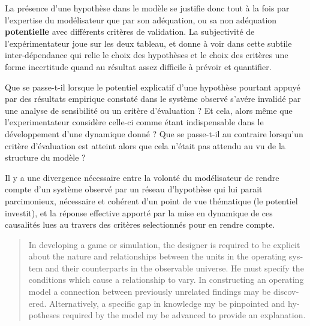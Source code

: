 
La présence d'une hypothèse dans le modèle se justifie donc tout à la fois par l'expertise du modélisateur que par son adéquation, ou sa non adéquation \textbf{potentielle} avec différents critères de validation. La subjectivité de l'expérimentateur joue sur les deux tableau, et donne à voir dans cette subtile inter-dépendance qui relie le choix des hypothèses et le choix des critères une forme incertitude quand au résultat assez difficile à prévoir et quantifier.

Que se passe-t-il lorsque le potentiel explicatif d'une hypothèse pourtant appuyé par des résultats empirique constaté dans le système observé s'avére invalidé par une analyse de sensibilité ou un critère d'évaluation ? Et cela, alors même que l'experimentateur considère celle-ci comme étant indispensable dans le développement d'une dynamique donné ? Que se passe-t-il au contraire lorsqu'un critère d'évaluation est atteint alors que cela n'était pas attendu au vu de la structure du modèle ? 


Il y a une divergence nécessaire entre la volonté du modélisateur de rendre compte d'un système observé par un réseau d'hypothèse qui lui parait parcimonieux, nécessaire et cohérent d'un point de vue thématique (le potentiel investit), et la réponse effective apporté par la mise en dynamique de ces causalités lues au travers des critères selectionnés pour en rendre compte. %

\foreignblockquote{english}[{\cite[219]{Hermann1967}}]{In developing a game or simulation, the designer is required to be explicit about the nature and relationships between the units in the operating system and their counterparts in the observable universe. He must specify the conditions which cause a relationship to vary. In constructing an operating model a connection between previously unrelated findings may be discovered. Alternatively, a specific gap in knowledge my be pinpointed and hypotheses required by the model my be advanced to provide an explanation.} 

